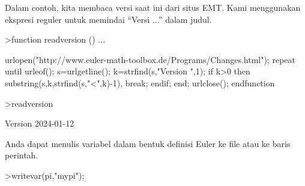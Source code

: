 \documentclass[a4paper,10pt]{article}
\begin{document}
\begin{eulernotebook}
\begin{eulercomment}
\begin{eulercomment}
\begin{eulercomment}
\begin{eulercomment}
\begin{eulercomment}
\begin{eulercomment}
\begin{eulercomment}
\begin{eulercomment}
\begin{eulercomment}
\begin{eulercomment}
\begin{eulercomment}
\begin{eulercomment}
\begin{eulercomment}
\begin{eulercomment}
\begin{eulercomment}
\begin{eulercomment}
\begin{eulercomment}
\begin{eulercomment}
\begin{eulercomment}
\begin{eulercomment}
\begin{eulercomment}
\begin{eulercomment}
\begin{eulercomment}
\begin{eulercomment}
\begin{eulercomment}
\begin{eulercomment}
\begin{eulercomment}
\begin{eulercomment}
\begin{eulercomment}
\begin{eulercomment}
\begin{eulercomment}
\begin{eulercomment}
\begin{eulercomment}
\begin{eulercomment}
\begin{eulercomment}
\begin{eulercomment}
\begin{eulercomment}
\begin{eulercomment}
\begin{eulercomment}
\begin{eulercomment}
\begin{eulercomment}
\begin{eulercomment}
\begin{eulercomment}
\begin{eulercomment}
\begin{eulercomment}
\begin{eulercomment}
\begin{eulercomment}
\begin{eulercomment}
\begin{eulercomment}
\begin{eulercomment}
\begin{eulercomment}
Dalam contoh, kita membaca versi saat ini dari situs EMT. Kami
menggunakan ekspresi reguler untuk memindai “Versi ...” dalam judul.
\end{eulercomment}
\begin{eulerprompt}
>function readversion () ...
\end{eulerprompt}
\begin{eulerudf}
  urlopen("http://www.euler-math-toolbox.de/Programs/Changes.html");
  repeat
    until urleof();
    s=urlgetline();
    k=strfind(s,"Version ",1);
    if k>0 then substring(s,k,strfind(s,"<",k)-1), break; endif;
  end;
  urlclose();
  endfunction
\end{eulerudf}
\begin{eulerprompt}
>readversion
\end{eulerprompt}
\begin{euleroutput}
  Version 2024-01-12
\end{euleroutput}
\begin{eulercomment}
Anda dapat menulis variabel dalam bentuk definisi Euler ke file atau
ke baris perintah.
\end{eulercomment}
\begin{eulerprompt}
>writevar(pi,"mypi");

\end{eulerprompt}
\end{eulercomment}
\end{eulercomment}
\end{eulercomment}
\end{eulercomment}
\end{eulercomment}
\end{eulercomment}
\end{eulercomment}
\end{eulercomment}
\end{eulercomment}
\end{eulercomment}
\end{eulercomment}
\end{eulercomment}
\end{eulercomment}
\end{eulercomment}
\end{eulercomment}
\end{eulercomment}
\end{eulercomment}
\end{eulercomment}
\end{eulercomment}
\end{eulercomment}
\end{eulercomment}
\end{eulercomment}
\end{eulercomment}
\end{eulercomment}
\end{eulercomment}
\end{eulercomment}
\end{eulercomment}
\end{eulercomment}
\end{eulercomment}
\end{eulercomment}
\end{eulercomment}
\end{eulercomment}
\end{eulercomment}
\end{eulercomment}
\end{eulercomment}
\end{eulercomment}
\end{eulercomment}
\end{eulercomment}
\end{eulercomment}
\end{eulercomment}
\end{eulercomment}
\end{eulercomment}
\end{eulercomment}
\end{eulercomment}
\end{eulercomment}
\end{eulercomment}
\end{eulercomment}
\end{eulercomment}
\end{eulercomment}
\end{eulercomment}
\end{eulernotebook}
\end{document}

